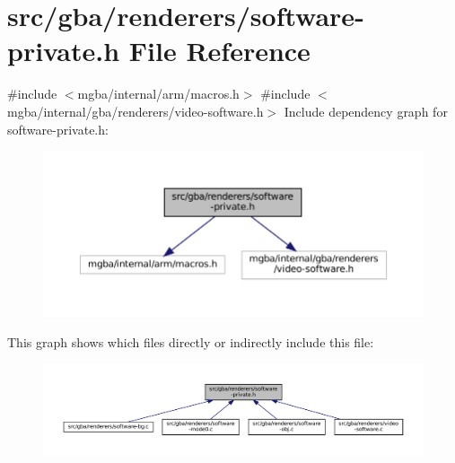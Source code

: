 \hypertarget{software-private_8h}{}\section{src/gba/renderers/software-\/private.h File Reference}
\label{software-private_8h}
{\ttfamily \#include $<$mgba/internal/arm/macros.\+h$>$}\newline
{\ttfamily \#include $<$mgba/internal/gba/renderers/video-\/software.\+h$>$}\newline
Include dependency graph for software-\/private.h\+:
\nopagebreak
\begin{figure}[H]
\begin{center}
\leavevmode
\includegraphics[width=350pt]{software-private_8h__incl}
\end{center}
\end{figure}
This graph shows which files directly or indirectly include this file\+:
\nopagebreak
\begin{figure}[H]
\begin{center}
\leavevmode
\includegraphics[width=350pt]{software-private_8h__dep__incl}
\end{center}
\end{figure}
